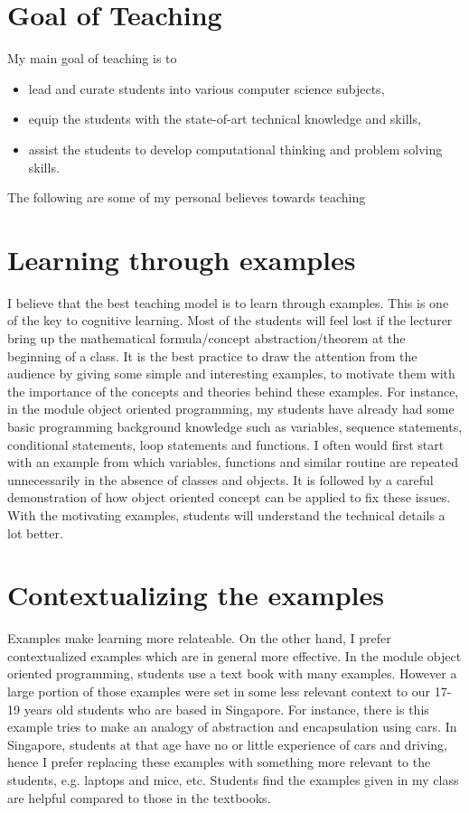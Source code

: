 \documentclass[12pt]{article}
\theoremstyle{plain} \numberwithin{equation}{section}
\theoremstyle{definition}
\begin{document}
\raisebox{1cm}

\section{Goal of Teaching}
My main goal of teaching is to
\begin{itemize}
   \item lead and curate students into various computer science subjects,
   \item equip the students with the state-of-art technical knowledge
     and skills,
   \item assist the students to develop computational thinking and problem solving skills. 
\end{itemize}
%
The following are some of my personal believes towards teaching

\section{Learning through examples}
I believe that the best teaching model is to learn through examples.
This is one of the key to cognitive learning. Most of the students will
feel lost if the lecturer bring up the mathematical formula/concept abstraction/theorem
at the beginning of a class. It is the best practice to draw the attention
from the audience by giving some simple and interesting examples, to motivate them with 
the importance of the concepts and theories behind these examples. For instance, in
the module object oriented programming, my students have already had
some basic programming background knowledge such as variables,
sequence statements, conditional statements, loop statements and
functions. I often would first start with an example from which variables, functions and similar routine are
repeated unnecessarily in the absence of classes and objects. It is
followed by a careful demonstration of how object oriented concept can be applied
to fix these issues. With the motivating examples, students will
understand the technical details a lot better.

\section{Contextualizing the examples}
Examples make learning more relateable. On the other hand,
I prefer contextualized examples which are in general
more effective. In the module object oriented programming, students
use a text book with many examples. However a large portion of
those examples were set in some less relevant context to our 17-19
years old students who are based in Singapore. For instance, there is
this example tries to make an analogy of abstraction and encapsulation
using cars. In Singapore, students at that age have no or little
experience of cars and driving, hence I prefer replacing these
examples with something more relevant to the students, e.g. laptops
and mice, etc. Students find the examples given in my class are
helpful compared to those in the textbooks.
\end{document}
